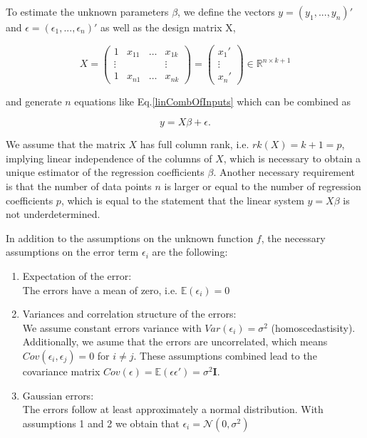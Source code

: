 \documentclass[10pt,a4paper]{article}
\begin{document}
	To estimate the unknown parameters $\beta$, we define the vectors $y = (y_1, ..., y_n)'$ and $\epsilon = (\epsilon_1, ..., \epsilon_n)'$ as well as the design matrix X, 
	
	$$X = \begin{pmatrix} 1     & x_{11} & \dots & x_{1k} \\ 
						 \vdots &        &       & \vdots \\ 
						  1     & x_{n1} & \dots & x_{nk}  
	 \end{pmatrix} = \begin{pmatrix} x_1' \\ 
	                               \vdots \\ x_n' 
	                  \end{pmatrix} \in \mathbb{R}^{n \times k+1}$$
	
	and generate $n$ equations like Eq.\ref{linCombOfInputs} which can be combined as 
	
	$$y = X\beta + \epsilon.$$
	
	We assume that the matrix $X$ has full column rank, i.e. $rk(X) = k + 1 = p$, implying linear independence of the columns of $X$, which is necessary to obtain a unique estimator of the regression coefficients $\beta$. Another necessary requirement is that the number of data points $n$ is larger or equal to the number of regression coefficients $p$, which is equal to the statement that the linear system $y = X\beta$ is not underdetermined.
	
	In addition to the assumptions on the unknown function $f$, the necessary assumptions on the error term $\epsilon_i$ are the following:
	
	\begin{enumerate}
		\item Expectation of the error: \\
		The errors have a mean of zero, i.e. $\mathbb E(\epsilon_i) = 0$
	
		\item Variances and correlation structure of the errors: \\
		We assume constant errors variance with $Var(\epsilon_i) = \sigma^2$ (homoscedastisity). Additionally, we asume that the errors are uncorrelated, which means $Cov(\epsilon_i, \epsilon_j) = 0$ for $i \ne j$. These assumptions combined lead to the covariance matrix $Cov(\epsilon) = \mathbb E(\epsilon \epsilon') 	= \sigma^2 \mathbf I$.
	
		\item Gaussian errors: \\
		The errors follow at least approximately a normal distribution. With assumptions 1 and 2 we obtain that $\epsilon_i = \mathcal N(0, \sigma^2)$ 
	\end{enumerate}
	
\end{document}
